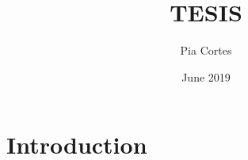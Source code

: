 \documentclass{article}
\title{TESIS}
\author{Pia Cortes}
\date{June 2019}
\begin{document}
\maketitle

\section{Introduction}
\end{document}
